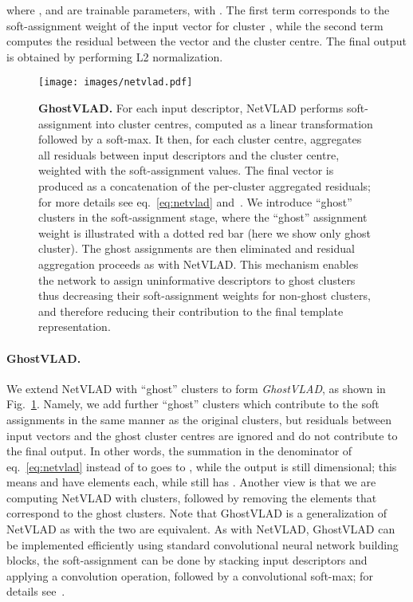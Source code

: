 \documentclass[runningheads]{llncs}
\begin{document}
where ,  and  are trainable parameters, with .
The first term corresponds to the soft-assignment weight
of the input vector  for cluster ,
while the second term computes the residual between the vector and
the cluster centre.
The final output is obtained by performing L2 normalization.



\begin{figure}[t]
   \begin{center}
         \texttt{[image: images/netvlad.pdf]}
   \end{center}
\caption{\textbf{GhostVLAD.}
For each input descriptor, NetVLAD performs soft-assignment
into  cluster centres, computed as a linear transformation
followed by a soft-max.
It then, for each cluster centre, aggregates all residuals 
between input descriptors and the cluster centre,
weighted with the soft-assignment values.
The final vector is produced as a concatenation of the per-cluster
aggregated residuals;
for more details see eq.~\ref{eq:netvlad} and~\cite{Arandjelovic16}.
We introduce  ``ghost'' clusters in the soft-assignment stage,
where the ``ghost'' assignment weight is illustrated
with a dotted red bar (here we show only  ghost cluster).
The ghost assignments are then eliminated and residual aggregation
proceeds as with NetVLAD.
This mechanism enables the network to assign uninformative descriptors
to ghost clusters thus decreasing their soft-assignment weights
for non-ghost clusters, and therefore reducing their contribution
to the final template representation.
   }
    \label{fig:ghost}
\end{figure}


\paragraph{GhostVLAD.}
We extend NetVLAD with ``ghost'' clusters to form \emph{GhostVLAD},
as shown in Fig.~\ref{fig:ghost}.
Namely, we add further 
``ghost'' clusters which contribute to the soft assignments in the
same manner as the original  clusters,
but residuals between input vectors and the ghost cluster centres
are ignored and do not contribute to the final output.
In other words, the summation in the denominator of
eq.~\ref{eq:netvlad} instead of to  goes to ,
while the output is still  dimensional;
this means  and  have  elements each,
while  still has .
Another view is that we are computing NetVLAD with  clusters,
followed by removing the elements that correspond to the 
ghost clusters.
Note that GhostVLAD is a generalization of NetVLAD as with 
the two are equivalent.
As with NetVLAD, GhostVLAD can be implemented efficiently using
standard convolutional neural network building blocks,
\eg the soft-assignment can be done by stacking input descriptors
and applying a convolution operation, followed by a convolutional soft-max;
for details see~\cite{Arandjelovic16}.
\end{document}
